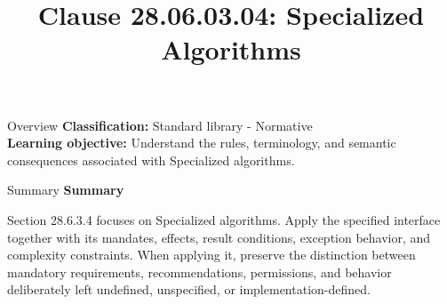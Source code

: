 \documentclass[10pt,letterpaper]{article}
\title{Clause 28.06.03.04: Specialized Algorithms}
\author{}
\date{}
\begin{document}
\maketitle
\begin{CornellOverviewBox}{Overview}
\textbf{Classification:} Standard library - Normative\\[2pt]
\textbf{Learning objective:} Understand the rules, terminology, and semantic consequences associated with Specialized algorithms.
\end{CornellOverviewBox}\begin{CornellSummaryBox}{Summary}
{\sffamily\bfseries\color{Accent} Summary}\par\vspace{3pt}Section 28.6.3.4 focuses on Specialized algorithms. Apply the specified interface together with its mandates, effects, result conditions, exception behavior, and complexity constraints. When applying it, preserve the distinction between mandatory requirements, recommendations, permissions, and behavior deliberately left undefined, unspecified, or implementation-defined.
\end{CornellSummaryBox}
\end{document}
